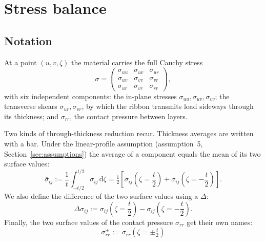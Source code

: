 \documentclass[11pt]{article}
\begin{document}
\section{Stress balance}\label{sec:balance}

\subsection{Notation}\label{sec:stress_state}
At a point $(u,v,\zeta)$ the material carries the full Cauchy stress
\begin{equation}\label{eq:cauchy}
    \sigma = \begin{pmatrix}
      \sigma_{uu} & \sigma_{uv} & \sigma_{ur}\\
      \sigma_{uv} & \sigma_{vv} & \sigma_{vr}\\
      \sigma_{ur} & \sigma_{vr} & \sigma_{rr}
    \end{pmatrix},
\end{equation}
with six independent components: the in-plane stresses
$\sigma_{uu},\sigma_{uv},\sigma_{vv}$; the transverse shears
$\sigma_{ur},\sigma_{vr}$, by which the ribbon transmits load sideways through
its thickness; and $\sigma_{rr}$, the contact pressure between layers.

Two kinds of through-thickness reduction recur. Thickness averages are written
with a bar. Under the linear-profile assumption (assumption~5,
Section~\ref{sec:assumptions}) the average of a component equals the mean of its
two surface values:
\begin{equation}\label{eq:bar_def}
    \bar\sigma_{ij} := \frac{1}{t}\int_{-t/2}^{t/2} \sigma_{ij}\,\mathrm d\zeta
    = \tfrac12\left[\sigma_{ij}\left(\zeta = \frac{t}{2}\right) + \sigma_{ij}\left(\zeta = -\frac{t}{2}\right)\right]. 
\end{equation}
We also define the difference of the two surface values using a $\Delta$:
\begin{equation}\label{eq:Delta_def}
    \Delta\sigma_{ij} := \sigma_{ij}\left(\zeta = \frac{t}{2}\right)
      - \sigma_{ij}\left(\zeta = -\frac{t}{2}\right).
\end{equation}
Finally, the two surface values of the contact pressure $\sigma_{rr}$ get their own names:
\begin{equation}
    \sigma_{rr}^{\pm} := \sigma_{rr}\!\left(\zeta = \pm\tfrac{t}{2}\right)
\end{equation}
\end{document}
